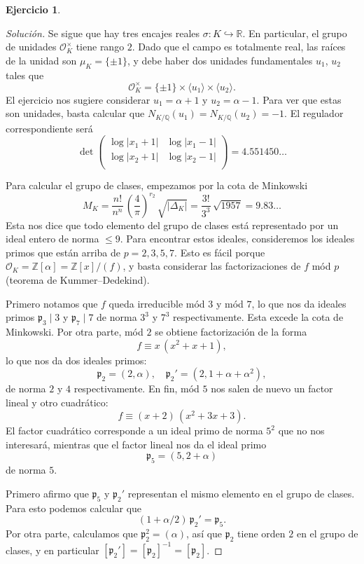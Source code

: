 \documentclass{article}
\theoremstyle{definition}
\newtheorem{ejercicio}{Ejercicio}
\newenvironment{solucion}{\begin{proof}[Solución]}{\end{proof}}
\newcommand{\ZZ}{\mathbb{Z}}
\newcommand{\QQ}{\mathbb{Q}}
\newcommand{\RR}{\mathbb{R}}
\renewcommand{\O}{\mathcal{O}}
\begin{document}
\begin{ejercicio}
\begin{solucion}
    Se sigue que hay tres encajes reales $\sigma\colon K \hookrightarrow \RR$.
    En particular, el grupo de unidades $\O_K^\times$ tiene rango $2$. Dado que
    el campo es totalmente real, las raíces de la unidad son
    $\mu_K = \{ \pm 1 \}$, y debe haber dos unidades fundamentales $u_1$, $u_2$
    tales que
    $$\O_K^\times = \{ \pm 1 \} \times \langle u_1\rangle \times \langle u_2\rangle.$$
    El ejercicio nos sugiere considerar $u_1 = \alpha + 1$ y $u_2 = \alpha - 1$.
    Para ver que estas son unidades, basta calcular que
    $N_{K/\QQ} (u_1) = N_{K/\QQ} (u_2) = -1$. El regulador correspondiente será
    \[ \det \begin{pmatrix}
        \log |x_1 + 1| & \log |x_1 - 1| \\
        \log |x_2 + 1| & \log |x_2 - 1| \\
      \end{pmatrix} = 4.551450\ldots \]

    Para calcular el grupo de clases, empezamos por la cota de Minkowski
    \[ M_K = \frac{n!}{n^n}\,\left(\frac{4}{\pi}\right)^{r_2}\,\sqrt{|\Delta_K|}
      = \frac{3!}{3^3}\,\sqrt{1957} = 9.83\ldots \]
    Esta nos dice que todo elemento del grupo de clases está representado por un
    ideal entero de norma $\le 9$. Para encontrar estos ideales, consideremos
    los ideales primos que están arriba de $p = 2,3,5,7$. Esto es fácil porque
    $\O_K = \ZZ [\alpha] = \ZZ [x]/(f)$, y basta considerar las factorizaciones
    de $f$ mód $p$ (teorema de Kummer--Dedekind).

    Primero notamos que $f$ queda irreducible mód $3$ y mód $7$, lo que nos da
    ideales primos $\mathfrak{p}_3 \mid 3$ y $\mathfrak{p}_7 \mid 7$ de norma
    $3^3$ y $7^3$ respectivamente. Esta excede la cota de Minkowski.
    Por otra parte, mód $2$ se obtiene factorización de la forma
    $$f \equiv x\,(x^2 + x + 1),$$
    lo que nos da dos ideales primos:
    \[ \mathfrak{p}_2 = (2, \alpha), \quad
      \mathfrak{p}_2' = (2, 1 + \alpha + \alpha^2), \]
    de norma $2$ y $4$ respectivamente. En fin, mód $5$ nos salen de nuevo un
    factor lineal y otro cuadrático:
    $$f \equiv (x + 2) \, (x^2 + 3x + 3).$$
    El factor cuadrático corresponde a un ideal primo de norma $5^2$ que no nos
    interesará, mientras que el factor lineal nos da el ideal primo
    $$\mathfrak{p}_5 = (5, 2 + \alpha)$$
    de norma $5$.

    Primero afirmo que $\mathfrak{p}_5$ y $\mathfrak{p}_2'$ representan el mismo
    elemento en el grupo de clases. Para esto podemos calcular que
    $$(1 + \alpha/2)\,\mathfrak{p}_2' = \mathfrak{p}_5.$$
    Por otra parte, calculamos que $\mathfrak{p}_2^2 = (\alpha)$, así que
    $\mathfrak{p}_2$ tiene orden $2$ en el grupo de clases, y en particular
    $[\mathfrak{p}_2'] = [\mathfrak{p}_2]^{-1} = [\mathfrak{p}_2]$.


\end{solucion}
\end{ejercicio}
\end{document}
